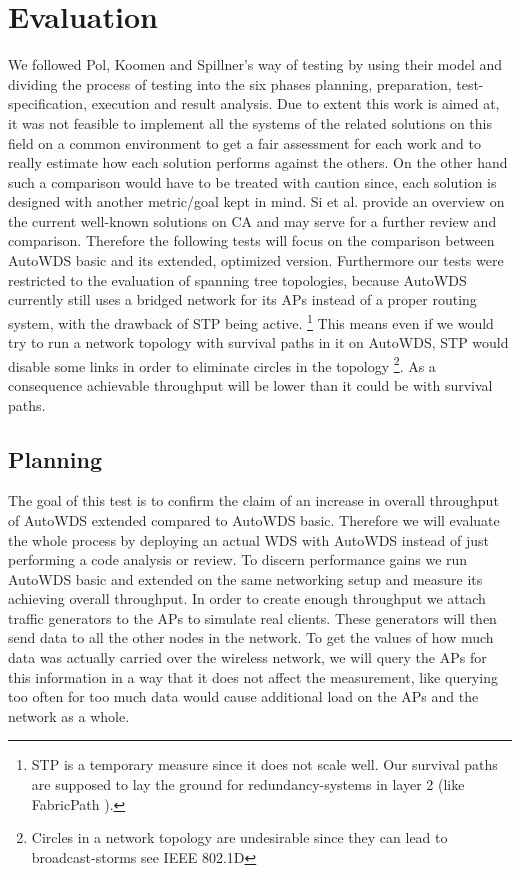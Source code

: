 \chapter{Evaluation}
We followed Pol, Koomen and Spillner's way of testing \cite{pol2000management} by using their model and dividing the process of testing into the 
six phases planning, preparation, test-specification, execution and result analysis. Due to extent this work is aimed at, 
it was not feasible to implement all the systems of the related solutions on this field on a common environment
to get a fair assessment for each work and to really estimate how each solution performs against the others. 
On the other hand such a comparison would have to be treated with caution since, each solution is designed with another metric/goal kept in mind.
Si et al. \cite{overview_caa} provide an overview on the current well-known solutions on \ac{CA} and may serve for a further review and comparison.
Therefore the following tests will focus on the comparison between AutoWDS basic and its extended, optimized version.
Furthermore our tests were restricted to the evaluation of spanning tree topologies, because AutoWDS currently 
still uses a bridged network for its APs instead of a proper routing system, with the drawback of \ac{STP} being active.
\footnote{\ac{STP} is a temporary measure since it does not scale well. 
Our survival paths are supposed to lay the ground for redundancy-systems in layer 2 (like FabricPath \cite{fabricpath}).} 
This means even if we would try to run a network topology with survival paths in it on AutoWDS, \ac{STP} would disable some links in order to 
eliminate circles in the topology \footnote{Circles in a network topology are undesirable since they can lead to broadcast-storms see \ac{IEEE} 802.1D}.
As a consequence achievable throughput will be lower than it could be with survival paths.

\newpage

  \section{Planning}
    The goal of this test is to confirm the claim of an increase in overall throughput of AutoWDS extended compared to AutoWDS basic.
    Therefore we will evaluate the whole process by deploying an actual \ac{WDS} with AutoWDS instead of just performing a code analysis or review.
    To discern performance gains we run AutoWDS basic and extended on the same networking setup and measure its achieving overall throughput.
    In order to create enough throughput we attach traffic generators to the APs to simulate real clients.
    These generators will then send data to all the other nodes in the network.
    To get the values of how much data was actually carried over the wireless network, we will query the APs for this information in a way that it 
    does not affect the measurement, like querying too often for too much data would cause additional load on the APs and the network as a whole.
    
